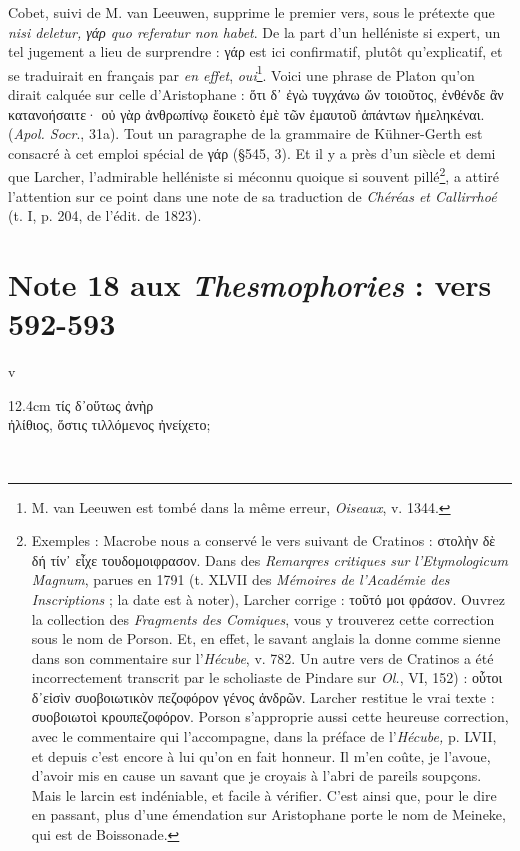 \documentclass{book}%
\newcommand{\italique}[1]{\textit{#1}}%
\newcommand{\espace}[1]{\hspace{#1}}%
\newlength{\larg}%
\newcommand{\decalage}[1]{%
\settowidth{\larg}{#1}%
\espace{\larg}%
}
\newcommand{\fantome}{{\color{white}v}}
\newcommand{\Note}[1]{\section*{#1}%
\addcontentsline{toc}{section}{#1}}
\newcommand{\note}[1]{\footnote{#1}}
\newcommand{\citComm}[1]{\fantome\\
\espace{1cm}\begin{minipagewithmarginpars}{12.4cm}%
#1
\end{minipagewithmarginpars}%
}
\begin{document}
Cobet, suivi de M. van Leeuwen, supprime le premier vers, sous le prétexte que \italique{nisi deletur, γάρ quo referatur non habet}. De la part d'un helléniste si expert, un tel jugement a lieu de surprendre : γάρ est ici confirmatif, plutôt qu'explicatif, et se traduirait en français par \italique{en effet}, \italique{oui}\note{M. van Leeuwen est tombé dans la même erreur, \italique{Oiseaux}, v. 1344.}. Voici une phrase de Platon qu'on dirait calquée sur celle d'Aristophane : ὅτι δ᾽ ἐγὼ τυγχάνω ὤν τοιοῦτος, ἐνθένδε ἂν κατανοήσαιτε· οὐ γὰρ ἀνθρωπίνῳ ἔοικετὸ ἐμὲ τῶν ἐμαυτοῦ ἁπάντων ἠμεληκέναι. (\italique{Apol. Socr}., 31a). Tout un paragraphe de la grammaire de Kühner-Gerth est consacré à cet emploi spécial de γάρ (§545, 3). Et il y a près d'un siècle et demi que Larcher, l'admirable helléniste si méconnu quoique si souvent pillé\note{Exemples : Macrobe nous a conservé le vers suivant de Cratinos : στολὴν δὲ δή τίν᾽ εἶχε τουδομοιφρασον. Dans des \italique{Remarqres critiques sur l'Etymologicum Magnum}, parues en 1791 (t. XLVII des \italique{Mémoires de l'Académie des Inscriptions} ; la date est à noter), Larcher corrige : τοῦτό μοι φράσον. Ouvrez la collection des \italique{Fragments des Comiques}, vous y trouverez cette correction sous le nom de Porson. Et, en effet, le savant anglais la donne comme sienne dans son commentaire sur l'\italique{Hécube}, v. 782. Un autre vers de Cratinos a été incorrectement transcrit par le scholiaste de Pindare sur \italique{Ol.}, VI, 152) : οὗτοι δ᾽εἰσὶν συοβοιωτικὸν πεζοφόρον γένος ἀνδρῶν. Larcher restitue le vrai texte :  συοβοιωτοὶ κρουπεζοφόρον. Porson s'approprie aussi cette heureuse correction, avec le commentaire qui l'accompagne, dans la préface de l'\italique{Hécube,} p. LVII, et depuis c'est encore à lui qu'on en fait honneur. Il m'en coûte, je l'avoue, d'avoir mis en cause un savant que je croyais à l'abri de pareils soupçons. Mais le larcin est indéniable, et facile à vérifier. C'est ainsi que, pour le dire en passant, plus d'une émendation sur Aristophane porte le nom de Meineke, qui est de Boissonade.}, a attiré l'attention sur ce point dans une note de sa traduction de \italique{Chéréas et Callirrhoé} (t. I, p. 204, de l'édit. de 1823).

\Note{Note 18 aux \italique{Thesmophories} : vers 592-593}

\citComm{\decalage{ἠλίθιος, ὅστις τιλ}τίς δ᾽οὕτως ἀνὴρ\\
	ἠλίθιος, ὅστις τιλλόμενος ἠνείχετο;}\\
\end{document}
